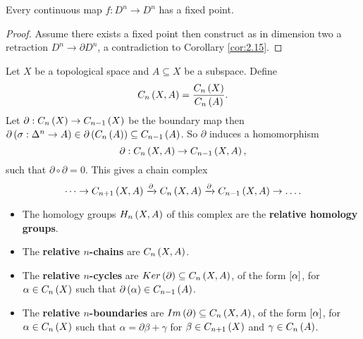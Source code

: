 \begin{theorem}
Every continuous map $ f : D^n \to D^n $ has a fixed point.
\end{theorem}

\begin{proof}
Assume there exists a fixed point then construct as in dimension two a retraction $ D^n \to \partial D^n $, a contradiction to Corollary \ref{cor:2.15}.
\end{proof}

Let $ X $ be a topological space and $ A \subseteq X $ be a subspace. Define
$$ C_n\rb{X, A} = \dfrac{C_n\rb{X}}{C_n\rb{A}}. $$
Let $ \partial : C_n\rb{X} \to C_{n - 1}\rb{X} $ be the boundary map then $ \partial\rb{\sigma : \Delta^n \to A} \in \partial\rb{C_n\rb{A}} \subseteq C_{n - 1}\rb{A} $. So $ \partial $ induces a homomorphism
$$ \partial : C_n\rb{X, A} \to C_{n - 1}\rb{X, A}, $$
such that $ \partial \circ \partial = 0 $. This gives a chain complex
$$ \dots \to C_{n + 1}\rb{X, A} \xrightarrow{\partial} C_n\rb{X, A} \xrightarrow{\partial} C_{n - 1}\rb{X, A} \to \dots. $$
\begin{itemize}
\item The homology groups $ H_n\rb{X, A} $ of this complex are the \textbf{relative homology groups}.
\item The \textbf{relative $ n $-chains} are $ C_n\rb{X, A} $.
\item The \textbf{relative $ n $-cycles} are $ Ker\rb{\partial} \subseteq C_n\rb{X, A} $, of the form $ \sb{\alpha} $, for $ \alpha \in C_n\rb{X} $ such that $ \partial\rb{\alpha} \in C_{n - 1}\rb{A} $.
\item The \textbf{relative $ n $-boundaries} are $ Im\rb{\partial} \subseteq C_n\rb{X, A} $, of the form $ \sb{\alpha} $, for $ \alpha \in C_n\rb{X} $ such that $ \alpha = \partial\beta + \gamma $ for $ \beta \in C_{n + 1}\rb{X} $ and $ \gamma \in C_n\rb{A} $.
\end{itemize}


